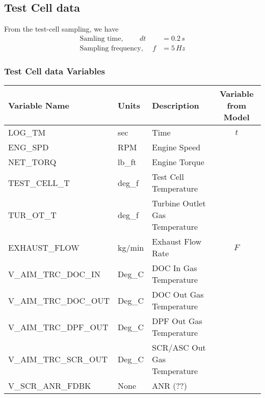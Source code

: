 \subsection{Test Cell data}
From the test-cell sampling, we have
\begin{align*}
    \text{Samling time, } \qquad dt &= 0.2 \, s\\
    \text{Sampling frequency, } \quad f &= 5\, Hz
\end{align*}


\subsubsection{Test Cell data Variables}
\begin{table}[H]
\centering
\begin{tabular}{l l l c}
   \hline \hline
   Variable Name                 & Units  & Description & Variable from Model \\ \hline \hline
   LOG\_TM	                     & sec    & Time
                                          & $t$\\
   ENG\_SPD	                     & RPM    & Engine Speed
                                          &\\
   NET\_TORQ	                 & lb\_ft & Engine Torque
                                          &\\
   TEST\_CELL\_T	             & deg\_f & Test Cell Temperature
                                          &\\
   TUR\_OT\_T	                 & deg\_f & Turbine Outlet Gas Temperature
                                          &\\
   EXHAUST\_FLOW	             & kg/min & Exhaust Flow Rate
                                          & $F$\\
   V\_AIM\_TRC\_DOC\_IN	         & Deg\_C & DOC In Gas Temperature
                                          &\\
   V\_AIM\_TRC\_DOC\_OUT	     & Deg\_C & DOC Out Gas Temperature
                                          &\\
   V\_AIM\_TRC\_DPF\_OUT	     & Deg\_C & DPF Out Gas Temperature
                                          &\\
   V\_AIM\_TRC\_SCR\_OUT	     & Deg\_C & SCR/ASC Out Gas Temperature
                                          &\\
   V\_SCR\_ANR\_FDBK	         & None   & ANR (??)
                                          &\\

\end{tabular}
\end{table}
